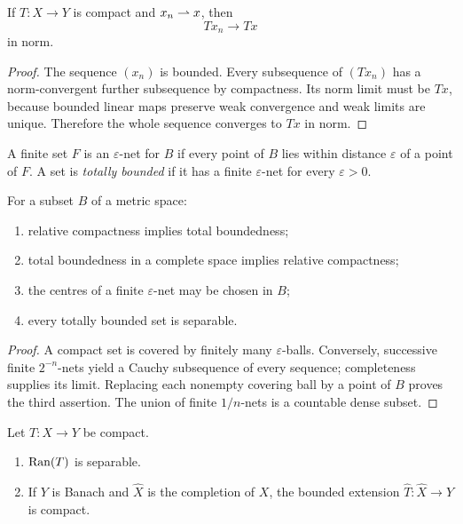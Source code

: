 \begin{notetheorem}
If $T\colon X\to Y$ is compact and $x_n\rightharpoonup x$, then
\[
  Tx_n\longrightarrow Tx
\]
in norm.
\end{notetheorem}

\begin{proof}
The sequence $(x_n)$ is bounded.  Every subsequence of $(Tx_n)$ has a
norm-convergent further subsequence by compactness.  Its norm limit must be
$Tx$, because bounded linear maps preserve weak convergence and weak limits
are unique.  Therefore the whole sequence converges to $Tx$ in norm.
\end{proof}

\begin{notedefinition}
A finite set $F$ is an $\varepsilon$-net for $B$ if every point of $B$ lies
within distance $\varepsilon$ of a point of $F$.  A set is \emph{totally
bounded} if it has a finite $\varepsilon$-net for every $\varepsilon>0$.
\end{notedefinition}

\begin{notelemma}
For a subset $B$ of a metric space:
\begin{enumerate}
  \item relative compactness implies total boundedness;
  \item total boundedness in a complete space implies relative compactness;
  \item the centres of a finite $\varepsilon$-net may be chosen in $B$;
  \item every totally bounded set is separable.
\end{enumerate}
\end{notelemma}

\begin{proof}
A compact set is covered by finitely many $\varepsilon$-balls.  Conversely,
successive finite $2^{-n}$-nets yield a Cauchy subsequence of every sequence;
completeness supplies its limit.  Replacing each nonempty covering ball by a
point of $B$ proves the third assertion.  The union of finite $1/n$-nets is a
countable dense subset.
\end{proof}

\begin{notetheorem}
Let $T\colon X\to Y$ be compact.
\begin{enumerate}
  \item $\operatorname{Ran}(T)$ is separable.
  \item If $Y$ is Banach and $\widehat X$ is the completion of $X$, the
        bounded extension $\widehat T\colon\widehat X\to Y$ is compact.
\end{enumerate}
\end{notetheorem}

